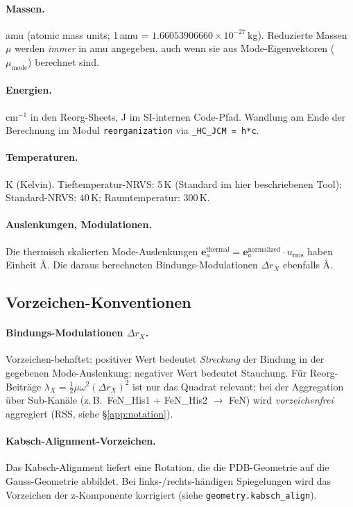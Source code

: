 \documentclass[11pt,a4paper,twoside]{article}
\providecommand{\angstrom}{\text{\AA}}    %
\theoremstyle{remark}
\begin{document}
\paragraph{Massen.}
amu (atomic mass units; 1\,amu = $1.66053906660 \times 10^{-27}$\,kg).
Reduzierte Massen $\mu$ werden \emph{immer} in amu angegeben, auch
wenn sie aus Mode-Eigenvektoren ($\mu_\text{mode}$) berechnet sind.

\paragraph{Energien.}
cm$^{-1}$ in den Reorg-Sheets, J im SI-internen Code-Pfad. Wandlung
am Ende der Berechnung im Modul \texttt{reorganization} via
\verb|_HC_JCM = h*c|.

\paragraph{Temperaturen.}
K (Kelvin). Tieftemperatur-NRVS: 5\,K (Standard im hier
beschriebenen Tool); Standard-NRVS: 40\,K; Raumtemperatur: 300\,K.

\paragraph{Auslenkungen, Modulationen.}
Die thermisch skalierten Mode-Auslenkungen
$\mathbf{e}_a^\text{thermal} = \mathbf{e}_a^\text{normalized} \cdot
u_\text{rms}$ haben Einheit $\angstrom$. Die daraus berechneten
Bindungs-Modulationen $\Delta r_X$ ebenfalls $\angstrom$.

\subsection{Vorzeichen-Konventionen}

\paragraph{Bindungs-Modulationen $\Delta r_X$.}
Vorzeichen-behaftet: positiver Wert bedeutet \emph{Streckung} der
Bindung in der gegebenen Mode-Auslenkung; negativer Wert bedeutet
Stauchung. F\"ur Reorg-Beitr\"age $\lambda_X = \tfrac{1}{2}\mu\omega^2
(\Delta r_X)^2$ ist nur das Quadrat relevant; bei der Aggregation
\"uber Sub-Kan\"ale (z.\,B.\ FeN\_His1 + FeN\_His2 $\to$ FeN) wird
\emph{vorzeichenfrei} aggregiert (RSS, siehe \S\ref{app:notation}).

\paragraph{Kabsch-Alignment-Vorzeichen.}
Das Kabsch-Alignment liefert eine Rotation, die die PDB-Geometrie
auf die Gauss-Geometrie abbildet. Bei links-/rechts-h\"andigen
Spiegelungen wird das Vorzeichen der z-Komponente korrigiert
(siehe \texttt{geometry.kabsch\_align}).
\end{document}

